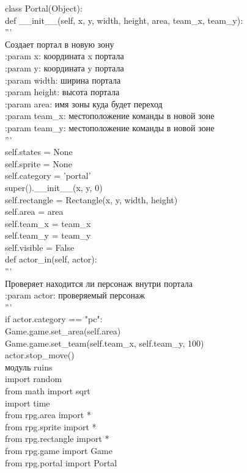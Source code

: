 class Portal(Object):\\
def \_\_init\_\_(self, x, y, width, height, area, team\_x, team\_y):\\
''' \\
Создает портал в новую зону\\

:param x: координата x портала\\
:param y: координата y портала\\
:param width: ширина портала\\
:param height: высота портала\\
:param area: имя зоны куда будет переход\\
:param team\_x: местоположение команды в новой зоне\\
:param team\_y: местоположение команды в новой зоне\\
'''\\
self.states = None\\
self.sprite = None\\
self.category = 'portal'\\
super().\_\_init\_\_(x, y, 0)\\
self.rectangle = Rectangle(x, y, width, height)\\
self.area = area\\
self.team\_x = team\_x\\
self.team\_y = team\_y\\
self.visible = False\\

def actor\_in(self, actor):\\
'''\\
Проверяет находится ли персонаж внутри портала\\

:param actor: проверяемый персонаж\\
'''\\
if actor.category == "pc":\\
Game.game.set\_area(self.area)\\
Game.game.set\_team(self.team\_x, self.team\_y, 100)\\
actor.stop\_move()\\

модуль ruins\\
import random\\
from math import sqrt\\
import time\\
from rpg.area import *\\
from rpg.sprite import *\\
from rpg.rectangle import *\\
from rpg.game import Game\\
from rpg.portal import Portal\\

